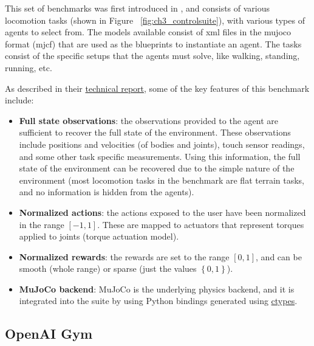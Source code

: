 This set of benchmarks was first introduced in \cite{Controlsuite}, and consists 
of various locomotion tasks (shown in Figure ~\ref{fig:ch3_controlsuite}), with various types of agents 
to select from. The models available consist of xml files in the mujoco format (mjcf) 
that are used as the blueprints to instantiate an agent. The tasks consist of the specific
setups that the agents must solve, like walking, standing, running, etc.

\figBenchmarkControlSuite

As described in their \href{https://arxiv.org/pdf/1801.00690.pdf}{technical report},
some of the key features of this benchmark include:

\begin{itemize}
    \item \textbf{Full state observations}: the observations provided to the agent
          are sufficient to recover the full state of the environment. These observations
          include positions and velocities (of bodies and joints), touch sensor readings,
          and some other task specific measurements. Using this information, the full state
          of the environment can be recovered due to the simple nature of the environment 
          (most locomotion tasks in the benchmark are flat terrain tasks, and no information
          is hidden from the agents).

    \item \textbf{Normalized actions}: the actions exposed to the user have been normalized 
          in the range $\left[-1,1\right]$. These are mapped to actuators that represent
          torques applied to joints (torque actuation model).

    \item \textbf{Normalized rewards}: the rewards are set to the range $\left[ 0, 1 \right]$, 
          and can be smooth (whole range) or sparse (just the values $\left\{0,1\right\}$).

    \item \textbf{MuJoCo backend}: MuJoCo is the underlying physics backend, and it is
          integrated into the suite by using Python bindings generated using 
          \href{https://github.com/deepmind/dm_control/blob/master/dm_control/autowrap/autowrap.py}{ctypes}.
\end{itemize}

\subsection{OpenAI Gym}

